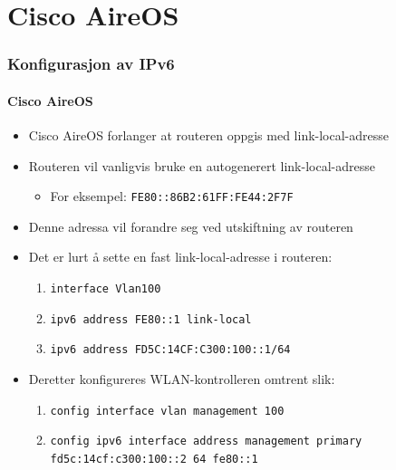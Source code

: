 \section{Cisco AireOS}
\begin{frame}%
  \frametitle{Konfigurasjon av IPv6}
  \framesubtitle{Cisco AireOS}
  \begin{itemize}%
  \item Cisco AireOS forlanger at routeren oppgis med link-local-adresse
  \item Routeren vil vanligvis bruke en autogenerert link-local-adresse
    \begin{itemize}
    \item For eksempel: \texttt{FE80::86B2:61FF:FE44:2F7F}
    \end{itemize}
  \item Denne adressa vil forandre seg ved utskiftning av routeren
  \item Det er lurt å sette en fast link-local-adresse i routeren:
    \begin{enumerate}%
    \item \texttt{interface Vlan100}
    \item \alert{\texttt{ipv6 address FE80::1 link-local}}
    \item \texttt{ipv6 address FD5C:14CF:C300:100::1/64}
    \end{enumerate}
  \item Deretter konfigureres WLAN-kontrolleren omtrent slik:
    \begin{enumerate}%
    \item \texttt{\footnotesize config interface vlan management 100}
    \item \texttt{\footnotesize config ipv6 interface address management primary fd5c:14cf:c300:100::2 64 \alert{fe80::1}}
    \end{enumerate}
  \end{itemize}
\end{frame}

